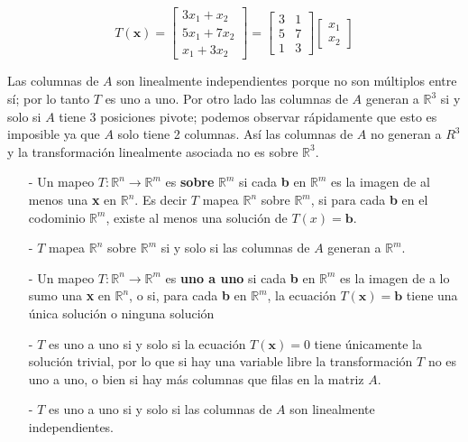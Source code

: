 \documentclass{article}
\begin{document}
\begin{equation*}
    T(\mathbf{x}) = \left[\begin{array}{rr}
        3x_1 + x_2\\
        5x_1 + 7x_2\\
        x_1  + 3x_2
    \end{array}\right]
    = \begin{bmatrix}
        3 & 1\\
        5 & 7\\
        1 & 3
    \end{bmatrix} \begin{bmatrix}
        x_1 \\ x_2
    \end{bmatrix}
\end{equation*}

Las columnas de $A$ son linealmente independientes porque no son múltiplos entre sí; por lo tanto $T$ es uno a uno. Por otro lado las columnas de $A$ generan a $\mathbb{R}^3$ si y solo si $A$ tiene 3 posiciones pivote; podemos observar rápidamente que esto es imposible ya que $A$ solo tiene 2 columnas. Así las columnas de $A$ no generan a $R^3$ y la transformación linealmente asociada no es sobre $\mathbb{R}^3$.

\begin{tcolorbox}[colback=red!10!white, colframe=red!70!black, title=Resumen]
    \begin{itemize}
        \item[-]Un mapeo $T: \mathbb{R}^n \rightarrow \mathbb{R}^m$ es \textbf{sobre} $\mathbb{R}^m$ si cada \textbf{b} en $\mathbb{R}^m$ es la imagen de al menos una \textbf{x} en $\mathbb{R}^n$. Es decir $T$ mapea $\mathbb{R}^n$ sobre $\mathbb{R}^m$, si para cada \textbf{b} en el codominio $\mathbb{R}^m$, existe al menos una solución de $T(x)=\mathbf{b}$.
        \item[-] $T$ mapea $\mathbb{R}^n$ sobre $\mathbb{R}^m$ si y solo si las columnas de $A$ generan a $\mathbb{R}^m$.
        \item[-] Un mapeo $T: \mathbb{R}^n \rightarrow \mathbb{R}^m$  es \textbf{uno a uno} si cada \textbf{b} en $\mathbb{R}^m$ es la imagen de a lo sumo una \textbf{x} en $\mathbb{R}^n$, o si, para cada \textbf{b} en $\mathbb{R}^m$, la ecuación $T(\mathbf{x}) = \mathbf{b}$ tiene una única solución o ninguna solución
        \item[-] $T$ es uno a uno si y solo si la ecuación $T(\mathbf{x}) = 0$ tiene únicamente la solución trivial, por lo que si hay una variable libre la transformación $T$ no es uno a uno, o bien si hay más columnas que filas en la matriz $A$. 
        \item[-] $T$ es uno a uno si y solo si las columnas de $A$ son linealmente independientes.        
    \end{itemize}
\end{tcolorbox}
\end{document}
